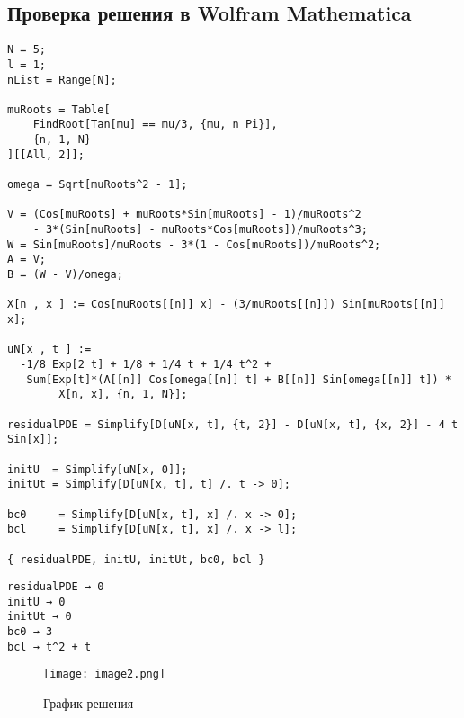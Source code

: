 \documentclass[a4paper,12pt]{article}
\begin{document}
\subsection*{Проверка решения в Wolfram Mathematica}
\begin{lstlisting}[style=wolfram]
N = 5;               
l = 1;               
nList = Range[N];

muRoots = Table[
    FindRoot[Tan[mu] == mu/3, {mu, n Pi}],
    {n, 1, N}
][[All, 2]];

omega = Sqrt[muRoots^2 - 1];

V = (Cos[muRoots] + muRoots*Sin[muRoots] - 1)/muRoots^2
    - 3*(Sin[muRoots] - muRoots*Cos[muRoots])/muRoots^3;
W = Sin[muRoots]/muRoots - 3*(1 - Cos[muRoots])/muRoots^2;
A = V;
B = (W - V)/omega;

X[n_, x_] := Cos[muRoots[[n]] x] - (3/muRoots[[n]]) Sin[muRoots[[n]] x];

uN[x_, t_] := 
  -1/8 Exp[2 t] + 1/8 + 1/4 t + 1/4 t^2 +
   Sum[Exp[t]*(A[[n]] Cos[omega[[n]] t] + B[[n]] Sin[omega[[n]] t]) *
        X[n, x], {n, 1, N}];

residualPDE = Simplify[D[uN[x, t], {t, 2}] - D[uN[x, t], {x, 2}] - 4 t Sin[x]];

initU  = Simplify[uN[x, 0]];
initUt = Simplify[D[uN[x, t], t] /. t -> 0];

bc0     = Simplify[D[uN[x, t], x] /. x -> 0];
bcl     = Simplify[D[uN[x, t], x] /. x -> l];

{ residualPDE, initU, initUt, bc0, bcl }
\end{lstlisting}

\begin{tcolorbox}[
  colback=wolframbox,
  colframe=gray,
  title=Результаты выполнения,
  boxrule=0.5pt,
  left=2mm,right=2mm,top=1mm,bottom=1mm,
  fontupper=\small\ttfamily
]
\begin{verbatim}
residualPDE → 0
initU → 0
initUt → 0
bc0 → 3
bcl → t^2 + t
\end{verbatim}
\end{tcolorbox}

\begin{figure}[htbp]
    \centering
    \texttt{[image: image2.png]}
    \caption{График решения}
    \label{fig:enter-label}
\end{figure}
\end{document}
